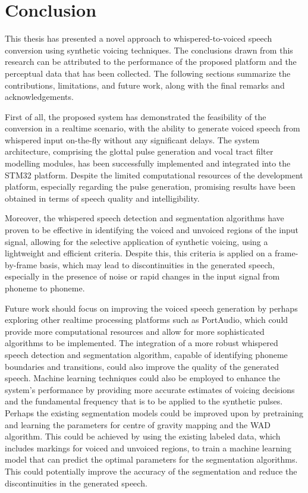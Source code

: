 \chapter{Conclusion} \label{chap:conclusion}

This thesis has presented a novel approach to whispered-to-voiced speech conversion using synthetic voicing techniques. The conclusions drawn from this research can be attributed to the performance of the proposed platform and the perceptual data that has been collected. The following sections summarize the contributions, limitations, and future work, along with the final remarks and acknowledgements.

First of all, the proposed system has demonstrated the feasibility of the conversion in a realtime scenario, with the ability to generate voiced speech from whispered input on-the-fly without any significant delays. The system architecture, comprising the glottal pulse generation and vocal tract filter modelling modules, has been successfully implemented and integrated into the STM32 platform. Despite the limited computational resources of the development platform, especially regarding the pulse generation, promising results have been obtained in terms of speech quality and intelligibility.

Moreover, the whispered speech detection and segmentation algorithms have proven to be effective in identifying the voiced and unvoiced regions of the input signal, allowing for the selective application of synthetic voicing, using a lightweight and efficient criteria. Despite this, this criteria is applied on a frame-by-frame basis, which may lead to discontinuities in the generated speech, especially in the presence of noise or rapid changes in the input signal from phoneme to phoneme.

Future work should focus on improving the voiced speech generation by perhaps exploring other realtime processing platforms such as PortAudio, which could provide more computational resources and allow for more sophisticated algorithms to be implemented. The integration of a more robust whispered speech detection and segmentation algorithm, capable of identifying phoneme boundaries and transitions, could also improve the quality of the generated speech. Machine learning techniques could also be employed to enhance the system's performance by providing more accurate estimates of voicing decisions and the fundamental frequency that is to be applied to the synthetic pulses. Perhaps the existing segmentation models could be improved upon by pretraining and learning the parameters for centre of gravity mapping and the WAD algorithm. This could be achieved by using the existing labeled data, which includes markings for voiced and unvoiced regions, to train a machine learning model that can predict the optimal parameters for the segmentation algorithms. This could potentially improve the accuracy of the segmentation and reduce the discontinuities in the generated speech. 

